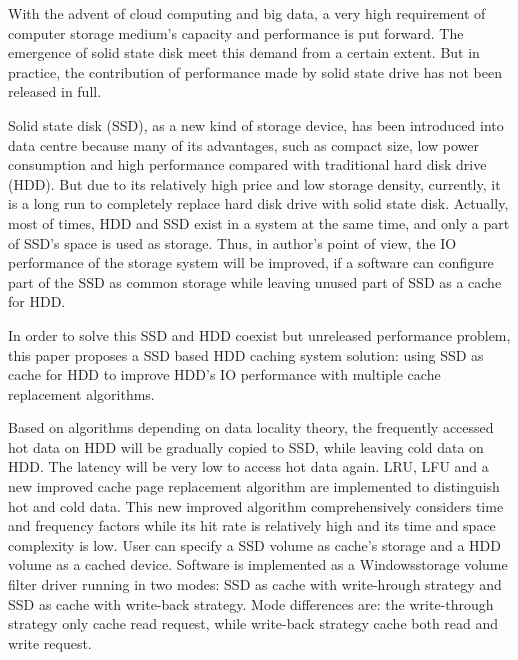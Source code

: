 
\begin{eabstract}

\noindent With the advent of cloud computing and big data, a very high requirement of computer storage medium's capacity and performance is put forward. The emergence of solid state disk meet this demand from a certain extent. But in practice, the contribution of performance made by solid state drive has not been released in full.
\vspace{1em}

\noindent Solid state disk (SSD), as a new kind of storage device, has been introduced into data centre because many of its advantages, such as compact size, low power consumption and high performance compared with traditional hard disk drive (HDD). But due to its relatively high price and low storage density, currently, it is a long run to completely replace hard disk drive with solid state disk. Actually, most of times, HDD and SSD exist in a system at the same time, and only a part of SSD's space is used as storage. Thus, in author's point of view, the IO performance of the storage system will be improved, if a software can configure part of the SSD as common storage while leaving unused part of SSD as a cache for HDD.
\vspace{1em}

\noindent In order to solve this SSD and HDD coexist but unreleased performance problem, this paper proposes a SSD based HDD caching system solution: using SSD as cache for HDD to improve HDD's IO performance with multiple cache replacement algorithms.
\vspace{1em}

\noindent Based on algorithms depending on data locality theory, the frequently accessed hot data on HDD will be gradually copied to SSD, while leaving cold data on HDD. The latency will be very low to access hot data again. LRU, LFU and a new improved cache page replacement algorithm are implemented to distinguish hot and cold data. This new improved algorithm comprehensively considers time and frequency factors while its hit rate is relatively high and its time and space complexity is low. User can specify a SSD volume as cache's storage and a HDD volume as a cached device. Software is implemented as a Windows\textregistered storage volume filter driver running in two modes: SSD as cache with write-hrough strategy and SSD as cache with write-back strategy. Mode differences are: the write-through strategy only cache read request, while write-back strategy cache both read and write request.
\vspace{1em}


\end{eabstract}
